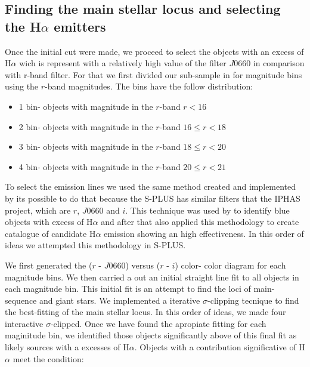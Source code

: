 \documentclass[fleqn,usenatbib]{mnras}
\begin{document}
\subsection{Finding the main stellar locus and selecting the H{$\alpha$ emitters}}
\label{sec:}

Once the initial cut were made, we proceed to select the objects with
an excess of H{$\alpha$} wich is represent with a relatively high value of
the filter $J$0660 in comparison with r-band filter. For that we
first divided our sub-sample in for magnitude bins using the $r$-band
magnitudes. The bins have the follow distribution:

\begin{itemize}
\item 1 bin- objects with magnitude in the $r$-band $r < 16$
\item 2 bin- objects with magnitude in the $r$-band $16 \leq r < 18$
\item 3 bin- objects with magnitude in the $r$-band $18 \leq r < 20$
\item 4 bin- objects with magnitude in the $r$-band $20 \leq r < 21$
  
\end{itemize}

To select the emission lines we used the same method created and
implemented by \citet{Witham:2008} its possible to do that because
the S-PLUS has similar filters that the IPHAS project, which are
$r$, $J$0660 and $i$. This technique was used by \citet{Scaringi:2013}
to identify blue objects with excess of H{$\alpha$} and after that
\citet{Wevers:2017} also applied this methodology to create catalogue
of candidate H{$\alpha$} emission showing an high effectiveness. In this
order of ideas we attempted this methodology in S-PLUS.

We first generated the ($r$ - $J$0660) versus ($r$ - $i$) color- color
diagram for each magnitude bins. We then carried a out an initial straight
line fit to all objects in each magnitude bin. This initial fit is an
attempt to find the loci of main-sequence and giant stars. We implemented
a iterative $\sigma$-clipping tecnique to find the best-fitting of the main
stellar locus. In this order of ideas, we made four interactive $\sigma$-clipped.
Once we have found the apropiate fitting for each maginitude bin, we identified
those objects significantly above of this final fit as likely sources with
a excesses of H{$\alpha$}. Objects with a contribution significative of
H{$\alpha$} meet the condition:
\end{document}
